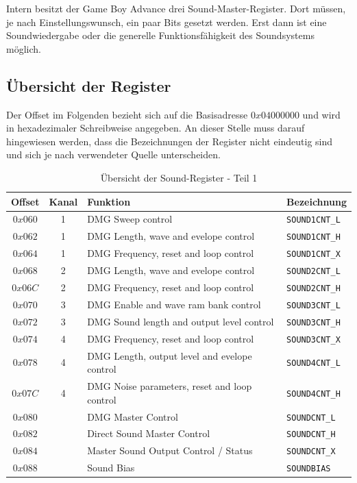 \documentclass[11pt,a4paper]{scrartcl}
\begin{document}
Intern besitzt der Game Boy Advance drei Sound-Master-Register. Dort m\"ussen, je nach Einstellungswunsch, ein paar Bits gesetzt werden. Erst dann ist eine Soundwiedergabe oder die generelle Funktionsf\"ahigkeit des Soundsystems m\"oglich.\cite{GameBoySoundsystem}


\subsection{\"Ubersicht der Register}

Der Offset im Folgenden bezieht sich auf die Basisadresse $0x04000000$ und wird in hexadezimaler Schreibweise angegeben. An dieser Stelle muss darauf hingewiesen werden, dass die Bezeichnungen der Register nicht eindeutig sind und sich je nach verwendeter Quelle unterscheiden.

\begin{table}[h]
    \centering
    \begin{tabular}{ c | c | p{10cm} | l }
        \textbf{Offset} & \textbf{Kanal} & \textbf{Funktion} & \textbf{Bezeichnung} \\
        \hline
        $0x060$ & 1 & DMG Sweep control & \verb|SOUND1CNT_L| \\
        \hline
        $0x062$ & 1 & DMG Length, wave and evelope control & \verb|SOUND1CNT_H| \\
        \hline
        $0x064$ & 1 & DMG Frequency, reset and loop control & \verb|SOUND1CNT_X| \\
        \hline
        $0x068$ & 2 & DMG Length, wave and evelope control & \verb|SOUND2CNT_L| \\
        \hline
        $0x06C$ & 2 & DMG Frequency, reset and loop control & \verb|SOUND2CNT_H| \\
        \hline
        $0x070$ & 3 & DMG Enable and wave ram bank control & \verb|SOUND3CNT_L| \\
        \hline
        $0x072$ & 3 & DMG Sound length and output level control & \verb|SOUND3CNT_H| \\
        \hline
        $0x074$ & 4 & DMG Frequency, reset and loop control & \verb|SOUND3CNT_X| \\
        \hline
        $0x078$ & 4 & DMG Length, output level and evelope control & \verb|SOUND4CNT_L| \\
        \hline
        $0x07C$ & 4 & DMG Noise parameters, reset and loop control & \verb|SOUND4CNT_H| \\
        \hline
        $0x080$ & & DMG Master Control & \verb|SOUNDCNT_L| \\
        \hline
        $0x082$ & & Direct Sound Master Control & \verb|SOUNDCNT_H| \\
        \hline
        $0x084$ & & Master Sound Output Control / Status & \verb|SOUNDCNT_X| \\
        \hline
        $0x088$ & & Sound Bias & \verb|SOUNDBIAS| \\
    \end{tabular}
    \caption{\"Ubersicht der Sound-Register - Teil 1}
    \label{table:SoundRegister1}
\end{table}
\end{document}
